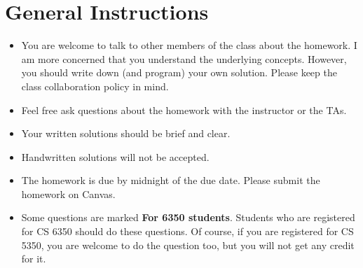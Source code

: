 \section*{General Instructions}

{\footnotesize
  \begin{itemize}
  \item You are welcome to talk to other members of the class about
    the homework. I am more concerned that you understand the
    underlying concepts. However, you should write down (and program)
    your own solution. Please keep the class collaboration policy in
    mind.

  \item Feel free ask questions about the homework with the instructor
    or the TAs.

  \item Your written solutions should be brief and clear.

  \item Handwritten solutions will not be accepted.

  \item The homework is due by midnight of the due date. Please submit
    the homework on Canvas.

  \item Some questions are marked {\bf For 6350 students}. Students
    who are registered for CS 6350 should do these questions. Of
    course, if you are registered for CS 5350, you are welcome to do
    the question too, but you will not get any credit for it.

  \end{itemize}
}


